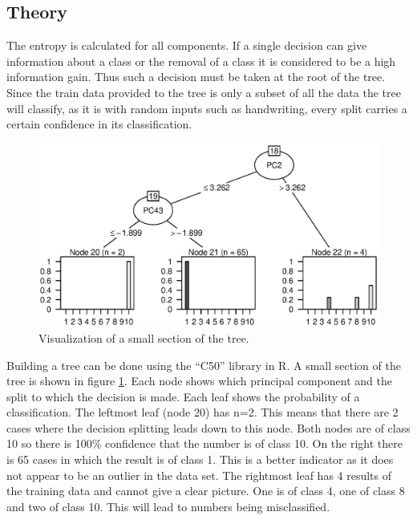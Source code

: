 \subsection{Theory}

The entropy is calculated for all components.
If a single decision can give information about a class or the removal of a class it is considered to be a high information gain.
Thus such a decision must be taken at the root of the tree.
Since the train data provided to the tree is only a subset of all the data the tree will classify, as it is with random inputs such as handwriting, every split carries a certain confidence in its classification.

\begin{figure}[h]
\includegraphics[width = \textwidth]{graphics/tree_section}
\caption[Visualization of a decision tree.]{Visualization of a small section of the tree.}
\label{fig:tree_section}
\end{figure}

Building a tree can be done using the ``C50'' library in R.
A small section of the tree is shown in figure \ref{fig:tree_section}.
Each node shows which principal component and the split to which the decision is made.
Each leaf shows the probability of a classification.
The leftmost leaf (node 20) has n=2. This means that there are 2 cases where the decision splitting leads down to this node.
Both nodes are of class 10 so there is 100\% confidence that the number is of class 10.
On the right there is 65 cases in which the result is of class 1. 
This is a better indicator as it does not appear to be an outlier in the data set.
The rightmost leaf has 4 results of the training data and cannot give a clear picture.
One is of class 4, one of class 8 and two of class 10. 
This will lead to numbers being misclassified.

